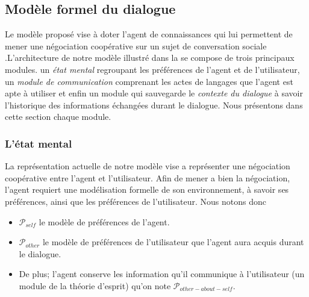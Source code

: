 \documentclass[a4paper,french]{article}
\begin{document}
\subsection{Modèle formel du dialogue}
\par Le modèle proposé vise à doter l'agent de connaissances qui lui permettent de mener une négociation coopérative sur un sujet de conversation sociale
.L'architecture de notre modèle illustré dans la  se compose de trois principaux modules. un \textit{état mental} regroupant les préférences de l'agent et de l'utilisateur, un \textit{module de communication} comprenant les actes de langages que l'agent est apte à utiliser et enfin un module qui sauvegarde le \textit{contexte du dialogue} à savoir l'historique des informations échangées durant le dialogue. Nous présentons dans cette section chaque module.

\begin{figure}
	\vskip 8pt
\end{figure}

\subsubsection{L'état mental}
\par La représentation actuelle de notre modèle vise a représenter une négociation coopérative entre l'agent et l'utilisateur. Afin de mener a bien la négociation, l'agent requiert une modélisation formelle de son environnement, à savoir ses préférences, ainsi que les préférences de l'utilisateur. Nous notons donc
 \begin{itemize}
 	\item  $\mathcal{P}_{self}$ le modèle de préférences de l'agent.
 	\item $\mathcal{P}_{other}$ le modèle de préférences de l'utilisateur que l'agent aura acquis durant le dialogue.
 	\item De plus; l'agent conserve les information qu'il communique à l'utilisateur (un module de la théorie d'esprit) qu'on note $\mathcal{P}_{other-about-self}$.
 \end{itemize}
\end{document}
